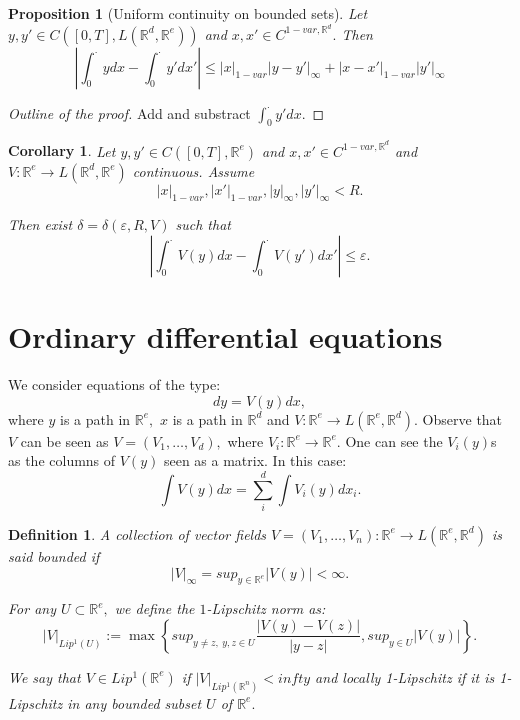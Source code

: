 \documentclass{article}
\newcommand{\R}{\mathbb{R}}
\newtheorem{definition}{Definition}
\newtheorem{prop}[theorem]{Proposition}
\newtheorem{corollary}[theorem]{Corollary}
\begin{document}
\begin{prop}[Uniform continuity on bounded sets]
   Let $y, y' \in C([0,T], L(\R^d, \R^e))$ and $x,x' \in C^{1-var, \R^d}.$ Then
\begin{equation}
    |\int_0^\cdot ydx - \int_0^\cdot y'dx'| \leq |x|_{1-var} |y - y'|_\infty + |x - x'|_{1-var} |y'|_\infty 
\end{equation} 
\end{prop}
\begin{proof}[Outline of the proof]
    Add and substract $\int_0^\cdot y'dx.$
\end{proof}

\begin{corollary}
     Let $y, y' \in C([0,T], \R^e)$ and $x,x' \in C^{1-var, \R^d}$ and $V: \R^e \rightarrow L(\R^d, \R^e)$ continuous. 
     Assume
     \begin{equation}
        |x|_{1-var}, |x'|_{1-var}, |y|_\infty, |y'|_\infty < R.
     \end{equation} 

     Then exist $\delta = \delta(\varepsilon, R, V)$ such that
     \begin{equation}
        |\int_0^\cdot V(y)dx - \int_0^\cdot V(y')dx'| \leq \varepsilon.
     \end{equation}
\end{corollary}

\section{Ordinary differential equations}

We consider equations of the type:
\begin{equation}
    dy = V(y) dx,
\end{equation}
where $y$ is a path in $\R^e,$ $x$ is a path in $\R^d$ and $V:\R^e \rightarrow L(\R^e, \R^d).$
Observe that $V$ can be seen as $V = (V_1, \ldots, V_d),$ where $V_i: \R^e \rightarrow \R^e.$
One can see the $V_i(y)$s as the columns of $V(y)$ seen as a matrix.
In this case:
\begin{equation}
    \int V(y) dx = \sum_i^d \int V_i(y) dx_i.
\end{equation} 

\begin{definition}
    A collection of vector fields $V = (V_1, \ldots, V_n) : \R^e \rightarrow L(\R^e, \R^d)$ is said \textit{bounded} if
    \begin{equation}
        |V|_\infty = sup_{y \in \R^e} |V(y)| < \infty.
    \end{equation}

    For any $U \subset \R^e,$ we define the $1$-Lipschitz norm as:
    \begin{equation}
        |V|_{Lip^1(U)} := \max \left\{ sup_{y \neq z,\ y,z \in U} \frac{|V(y) - V(z)|}{|y - z|}, sup_{y \in U} |V(y)| \right\}.
    \end{equation}

    We say that $V \in Lip^1(\R^e)$ if $|V|_{Lip^1(\R^n)} < infty$ and locally 1-Lipschitz if it is 1-Lipschitz in any bounded subset $U$ of $\R^e.$
\end{definition}
\end{document}
